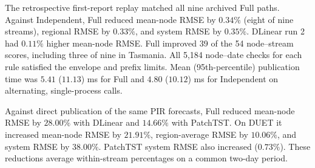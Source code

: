 The retrospective first-report replay matched all nine archived Full paths. Against Independent, Full reduced mean-node RMSE by \(0.34\%\) (eight of nine streams), regional RMSE by \(0.33\%\), and system RMSE by \(0.35\%\). DLinear run 2 had \(0.11\%\) higher mean-node RMSE. Full improved 39 of the 54 node--stream scores, including three of nine in Tasmania. All 5,184 node--date checks for each rule satisfied the envelope and prefix limits. Mean (95th-percentile) publication time was \(5.41\) (\(11.13\)) ms for Full and \(4.80\) (\(10.12\)) ms for Independent on alternating, single-process calls.
 
Against direct publication of the same PIR forecasts, Full reduced mean-node RMSE by \(28.00\%\) with DLinear and \(14.66\%\) with PatchTST. On DUET it increased mean-node RMSE by \(21.91\%\), region-average RMSE by \(10.06\%\), and system RMSE by \(38.00\%\). PatchTST system RMSE also increased (\(0.73\%\)). These reductions average within-stream percentages on a common two-day period.

